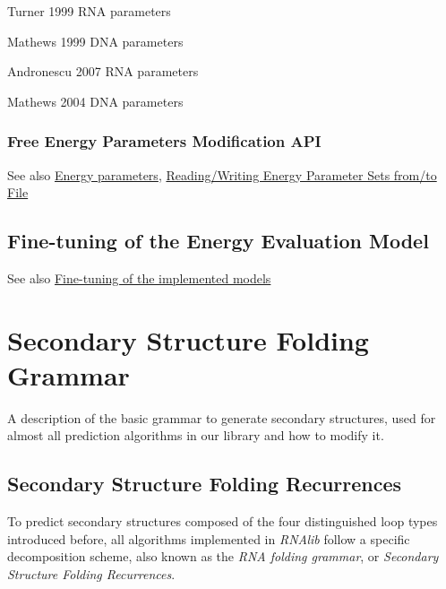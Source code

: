 \begin{DoxyItemize}
\item Turner 1999 R\+NA parameters
\item Mathews 1999 D\+NA parameters
\item Andronescu 2007 R\+NA parameters
\item Mathews 2004 D\+NA parameters
\end{DoxyItemize}\hypertarget{energy_evaluation_sec_energy_parameters_api}{}\subsubsection{Free Energy Parameters Modification A\+PI}\label{energy_evaluation_sec_energy_parameters_api}
\begin{DoxySeeAlso}{See also}
\hyperlink{group__energy__parameters}{Energy parameters}, \hyperlink{group__energy__parameters__rw}{Reading/\+Writing Energy Parameter Sets from/to File}
\end{DoxySeeAlso}
\hypertarget{energy_evaluation_sec_model_details}{}\subsection{Fine-\/tuning of the Energy Evaluation Model}\label{energy_evaluation_sec_model_details}
\begin{DoxySeeAlso}{See also}
\hyperlink{group__model__details}{Fine-\/tuning of the implemented models}
\end{DoxySeeAlso}
 \hypertarget{folding_grammar}{}\section{Secondary Structure Folding Grammar}\label{folding_grammar}
A description of the basic grammar to generate secondary structures, used for almost all prediction algorithms in our library and how to modify it.\hypertarget{folding_grammar_sec_recursions}{}\subsection{Secondary Structure Folding Recurrences}\label{folding_grammar_sec_recursions}
To predict secondary structures composed of the four distinguished loop types introduced before, all algorithms implemented in {\itshape R\+N\+Alib} follow a specific decomposition scheme, also known as the {\itshape R\+NA folding grammar}, or {\itshape Secondary Structure Folding Recurrences}.

